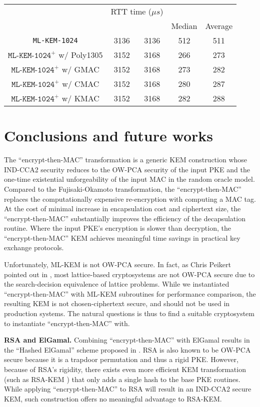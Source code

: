 \documentclass[journal=tches,submission]{iacrtrans}
\newcommand{\us}{\mu s}
\begin{document}
\begin{table}[H]
\begin{tabular}{|c|c|c|c|c|}
        & \multicolumn{2}{|c|}{RTT time ($\us$)} \\
        \cline{4-5}
        & & & Median & Average \\
        \hline
        \texttt{ML-KEM-1024} & 3136 & 3136 & 512 & 511 \\
        \hline
        $\texttt{ML-KEM-1024}^+$ w/ Poly1305 & 3152 & 3168 & 266 & 273 \\
        \hline
        $\texttt{ML-KEM-1024}^+$ w/ GMAC & 3152 & 3168 & 273 & 282 \\
        \hline
        $\texttt{ML-KEM-1024}^+$ w/ CMAC & 3152 & 3168 & 280 & 287 \\
        \hline
        $\texttt{ML-KEM-1024}^+$ w/ KMAC & 3152 & 3168 & 282 & 288 \\
        \hline
    \end{tabular}
\end{table}

\section{Conclusions and future works}\label{sec:future-works}
The ``encrypt-then-MAC'' transformation is a generic KEM construction whose IND-CCA2 security reduces to the OW-PCA security of the input PKE and the one-time existential unforgeability of the input MAC in the random oracle model. Compared to the Fujisaki-Okamoto transformation, the ``encrypt-then-MAC'' replaces the computationally expensive re-encryption with computing a MAC tag. At the cost of minimal increase in encapsulation cost and ciphertext size, the ``encrypt-then-MAC'' substantially improves the efficiency of the decapsulation routine. Where the input PKE's encryption is slower than decryption, the ``encrypt-then-MAC'' KEM achieves meaningful time savings in practical key exchange protocols.

Unfortunately, ML-KEM is not OW-PCA secure. In fact, as Chris Peikert pointed out in \cite{DBLP:conf/pqcrypto/Peikert14}, most lattice-based cryptosystems are not OW-PCA secure due to the search-decision equivalence of lattice problems. While we instantiated ``encrypt-then-MAC'' with ML-KEM subroutines for performance comparison, the resulting KEM is not chosen-ciphertext secure, and should not be used in production systems. The natural questions is thus to find a suitable cryptosystem to instantiate ``encrypt-then-MAC'' with.

\textbf{RSA and ElGamal.} Combining ``encrypt-then-MAC'' with ElGamal results in the ``Hashed ElGamal'' scheme proposed in \cite{DBLP:journals/iacr/AbdallaBR99}\cite{DBLP:conf/ctrsa/AbdallaBR01}. RSA is also known to be OW-PCA secure because it is a trapdoor permutation and thus a rigid PKE. However, because of RSA's rigidity, there exists even more efficient KEM transformation (such as RSA-KEM \cite{DBLP:journals/iacr/Shoup01}) that only adds a single hash to the base PKE routines. While applying ``encrypt-then-MAC'' to RSA will result in an IND-CCA2 secure KEM, such construction offers no meaningful advantage to RSA-KEM.
\end{document}
